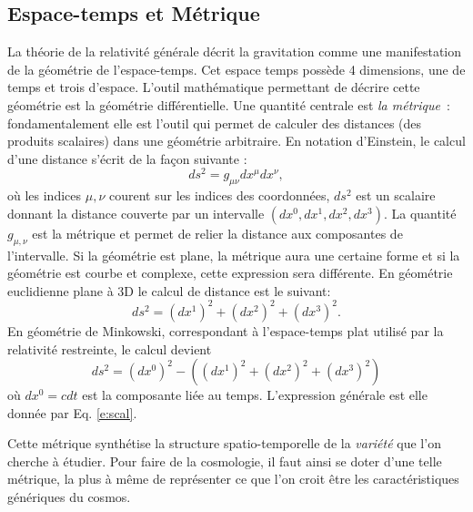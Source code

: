 \subsection{Espace-temps et Métrique}
La théorie de la relativité générale décrit la gravitation comme une manifestation de la géométrie de l'espace-temps. Cet espace temps possède 4 dimensions, une de temps et trois d'espace. L'outil mathématique permettant de décrire cette géométrie est la géométrie différentielle. Une quantité centrale est \textit{la métrique}~: fondamentalement elle est l'outil qui permet de calculer des distances (des produits scalaires) dans une géométrie arbitraire. En notation d'Einstein, le calcul d'une distance s'écrit de la façon suivante :
\begin{equation}
ds^2=g_{\mu\nu}dx^\mu dx^\nu,
\label{e:scal}
\end{equation}
où les indices $\mu,\nu$ courent sur les indices des coordonnées, $ds^2$ est un scalaire donnant la distance couverte par un intervalle $(dx^0,dx^1,dx^2,dx^3)$. La quantité $g_{\mu,\nu}$ est la métrique et permet de relier la distance aux composantes de l'intervalle. Si la géométrie est plane, la métrique aura une certaine forme et si la géométrie est courbe et complexe, cette expression sera différente. En géométrie euclidienne plane à 3D le calcul de distance est le suivant:
\begin{equation}
ds^2=(dx^1)^2+(dx^2)^2+(dx^3)^2.
\end{equation} 
En géométrie de Minkowski, correspondant à l'espace-temps plat utilisé par la relativité restreinte, le calcul devient
\begin{equation}
ds^2=(dx^0)^2 -((dx^1)^2+(dx^2)^2+(dx^3)^2)
\end{equation} 
où $dx^0=cdt$ est la composante liée au temps. L'expression générale est elle donnée par Eq. \ref{e:scal}.

Cette métrique synthétise la structure spatio-temporelle de la \textit{variété} que l'on cherche à étudier. Pour faire de la cosmologie, il faut ainsi se doter d'une telle métrique, la plus à même de représenter ce que l'on croit être les caractéristiques génériques du cosmos.

